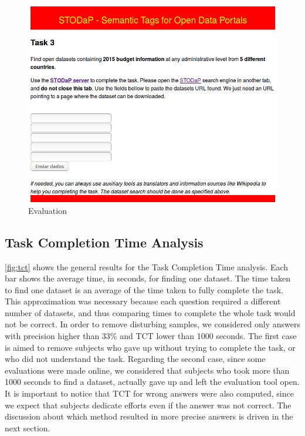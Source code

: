 \begin{figure}[h!]
\begin{center}
\includegraphics[width=\columnwidth]{images/eval_screenshot.png}
\caption[Evaluation]{Evaluation}
\label{fig:eval_screenshot}
\end{center}
\end{figure}

\subsection{Task Completion Time Analysis}

\autoref{fig:tct} shows the general results for the Task Completion Time analysis.
Each bar shows the average time, in seconds, for finding one dataset.
The time taken to find one dataset is an average of the time taken to fully complete the task.
This approximation was necessary because each question required a different number of datasets, and thus comparing times to complete the whole task would not be correct.
In order to remove disturbing samples, we considered only answers with precision higher than 33\% and TCT lower than 1000 seconds.
The first case is aimed to remove subjects who gave up without trying to complete the task, or who did not understand the task.
Regarding the second case, since some evaluations were made online, we considered that subjects who took more than 1000 seconds to find a dataset, actually gave up and left the evaluation tool open.
It is important to notice that TCT for wrong answers were also computed, since we expect that subjects dedicate efforts even if the answer was not correct.
The discussion about which method resulted in more precise answers is driven in the next section. 

